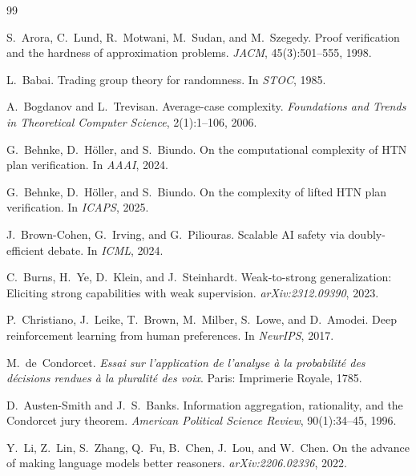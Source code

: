 \documentclass{article}
\theoremstyle{definition}
\theoremstyle{remark}
\begin{document}
\begin{thebibliography}{99}

S.~Arora, C.~Lund, R.~Motwani, M.~Sudan, and M.~Szegedy.
\newblock Proof verification and the hardness of approximation problems.
\newblock \emph{JACM}, 45(3):501--555, 1998.

L.~Babai.
\newblock Trading group theory for randomness.
\newblock In \emph{STOC}, 1985.

A.~Bogdanov and L.~Trevisan.
\newblock Average-case complexity.
\newblock \emph{Foundations and Trends in Theoretical Computer Science}, 2(1):1--106, 2006.

G.~Behnke, D.~H{\"o}ller, and S.~Biundo.
\newblock On the computational complexity of HTN plan verification.
\newblock In \emph{AAAI}, 2024.

G.~Behnke, D.~H{\"o}ller, and S.~Biundo.
\newblock On the complexity of lifted HTN plan verification.
\newblock In \emph{ICAPS}, 2025.

J.~Brown-Cohen, G.~Irving, and G.~Piliouras.
\newblock Scalable {AI} safety via doubly-efficient debate.
\newblock In \emph{ICML}, 2024.

C.~Burns, H.~Ye, D.~Klein, and J.~Steinhardt.
\newblock Weak-to-strong generalization: Eliciting strong capabilities with weak supervision.
\newblock \emph{arXiv:2312.09390}, 2023.

P.~Christiano, J.~Leike, T.~Brown, M.~Milber, S.~Lowe, and D.~Amodei.
\newblock Deep reinforcement learning from human preferences.
\newblock In \emph{NeurIPS}, 2017.

M.~de~Condorcet.
\newblock \emph{Essai sur l'application de l'analyse {\`a} la probabilit{\'e} des d{\'e}cisions rendues {\`a} la pluralit{\'e} des voix}.
\newblock Paris: Imprimerie Royale, 1785.

D.~Austen-Smith and J.~S.~Banks.
\newblock Information aggregation, rationality, and the {Condorcet} jury theorem.
\newblock \emph{American Political Science Review}, 90(1):34--45, 1996.

Y.~Li, Z.~Lin, S.~Zhang, Q.~Fu, B.~Chen, J.~Lou, and W.~Chen.
\newblock On the advance of making language models better reasoners.
\newblock \emph{arXiv:2206.02336}, 2022.


\end{thebibliography}
\end{document}
